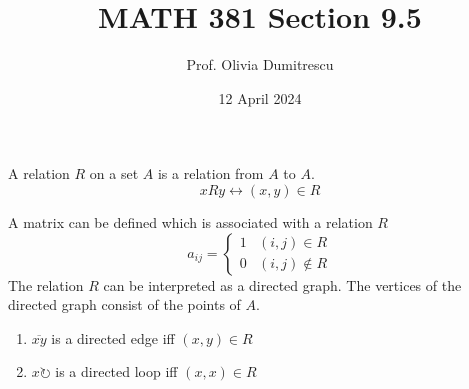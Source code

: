 \documentclass[letterpaper, 12pt]{article}
\title{MATH 381 Section 9.5}
\author{Prof. Olivia Dumitrescu}
\date{12 April 2024}
\newenvironment{definition}[1][Definition]{\begin{trivlist}
\item[\hskip \labelsep {\bfseries #1}]}{\end{trivlist}}
\newcommand{\0}{\emptyset}
\begin{document}
    \maketitle
    \begin{definition}
        A relation $R$ on a set $A$ is a relation from $A$ to $A$.
        \[xRy \leftrightarrow (x, y) \in R\]
    \end{definition}
    A matrix can be defined which is associated with a relation $R$
    \[a_{ij} = \begin{cases}
        1 & (i, j) \in R \\
        0 & (i, j) \notin R
    \end{cases}\]
    The relation $R$ can be interpreted as a directed graph. The vertices of the directed graph 
    consist of the points of $A$.
    \begin{enumerate}
        \item $\overline{xy}$ is a directed edge iff $(x, y) \in R$
        \item $x \circlearrowright$ is a directed loop iff $(x, x) \in R$
    \end{enumerate}
\end{document}
